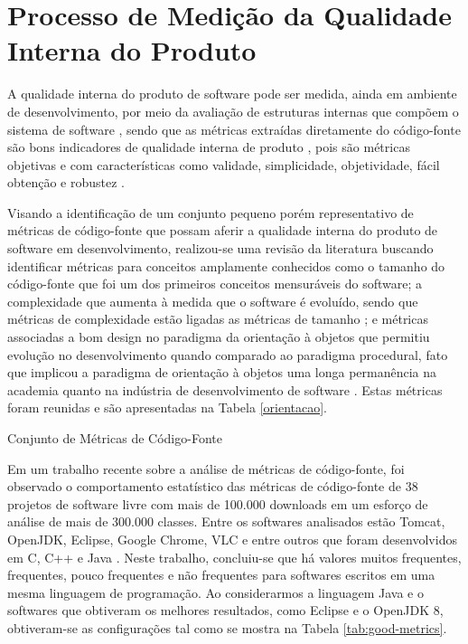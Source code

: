 \section{Processo de Medição da Qualidade Interna do Produto}

A qualidade interna do produto de software pode ser medida, ainda em ambiente de desenvolvimento, por meio da avaliação de estruturas internas que compõem o sistema de software \cite{ISO25023}, sendo que as métricas extraídas diretamente do código-fonte são bons indicadores de qualidade interna de produto \cite{beck2003test}, pois são métricas objetivas e com características como validade, simplicidade, objetividade, fácil obtenção e robustez \cite{Mills:1999}.  


Visando a identificação de um conjunto pequeno porém representativo de métricas de código-fonte que possam aferir a qualidade interna do produto de software em desenvolvimento, realizou-se uma revisão da literatura buscando identificar métricas para conceitos amplamente conhecidos como o tamanho do código-fonte que foi um dos primeiros conceitos mensuráveis do software; a complexidade que aumenta à medida que o software é evoluído, sendo que métricas de complexidade estão ligadas as métricas de tamanho \cite{Lehman1980b}; e métricas associadas a bom design no paradigma da orientação à objetos que permitiu evolução no desenvolvimento quando comparado ao paradigma procedural, fato que implicou a paradigma de orientação à objetos uma longa permanência na academia quanto na indústria de desenvolvimento de software \cite{Li1993}. Estas métricas foram reunidas e são apresentadas na Tabela \ref{orientacao}.     

	\begin{table}[!ht]
	\caption{Conjunto de Métricas de Código-Fonte}
	\addtolength{\belowcaptionskip}{6pt}
	\begin{center}
	
	\label{orientacao}
	\end{center}
	\end{table}
	\FloatBarrier

Em um trabalho recente sobre a análise de métricas de código-fonte, foi observado o comportamento estatístico das métricas de código-fonte de 38 projetos de software livre com mais de 100.000 downloads em um esforço de análise de mais de 300.000 classes. Entre os softwares analisados estão Tomcat, OpenJDK, Eclipse, Google Chrome, VLC e entre outros que foram desenvolvidos em C, C++ e Java \cite{Meirelles2013}. Neste trabalho, concluiu-se que há valores muitos frequentes, frequentes, pouco frequentes e não frequentes para softwares escritos em uma mesma linguagem de programação. Ao considerarmos a linguagem Java e o softwares que obtiveram os melhores resultados, como Eclipse e o OpenJDK 8, obtiveram-se as configurações tal como se mostra na Tabela \ref{tab:good-metrics}.  


